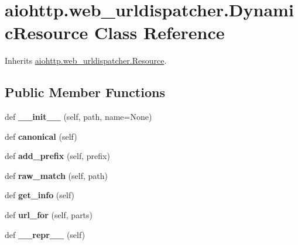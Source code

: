 \hypertarget{classaiohttp_1_1web__urldispatcher_1_1_dynamic_resource}{}\section{aiohttp.\+web\+\_\+urldispatcher.\+Dynamic\+Resource Class Reference}
\label{classaiohttp_1_1web__urldispatcher_1_1_dynamic_resource}


Inherits \hyperlink{classaiohttp_1_1web__urldispatcher_1_1_resource}{aiohttp.\+web\+\_\+urldispatcher.\+Resource}.

\subsection*{Public Member Functions}
\begin{DoxyCompactItemize}
\item 
\mbox{\label{classaiohttp_1_1web__urldispatcher_1_1_dynamic_resource_adb462e3f3c70510bf210acc165533615}} 
def {\bfseries \+\_\+\+\_\+init\+\_\+\+\_\+} (self, path, name=None)
\item 
\mbox{\label{classaiohttp_1_1web__urldispatcher_1_1_dynamic_resource_ab61a73f7f1d735e2e071a0a6e5622200}} 
def {\bfseries canonical} (self)
\item 
\mbox{\label{classaiohttp_1_1web__urldispatcher_1_1_dynamic_resource_ad75e848ad69575bb8937ef26b20239b6}} 
def {\bfseries add\+\_\+prefix} (self, prefix)
\item 
\mbox{\label{classaiohttp_1_1web__urldispatcher_1_1_dynamic_resource_acf1f2350bdfb768fd7d925f8817109c2}} 
def {\bfseries raw\+\_\+match} (self, path)
\item 
\mbox{\label{classaiohttp_1_1web__urldispatcher_1_1_dynamic_resource_a1981eee5c44d1716635401b82584e9d9}} 
def {\bfseries get\+\_\+info} (self)
\item 
\mbox{\label{classaiohttp_1_1web__urldispatcher_1_1_dynamic_resource_a70e4c6421975acb0a8e00985991b8b82}} 
def {\bfseries url\+\_\+for} (self, parts)
\item 
\mbox{\label{classaiohttp_1_1web__urldispatcher_1_1_dynamic_resource_a01e979106b61ff9a81a5255d3399d0fe}} 
def {\bfseries \+\_\+\+\_\+repr\+\_\+\+\_\+} (self)
\end{DoxyCompactItemize}
